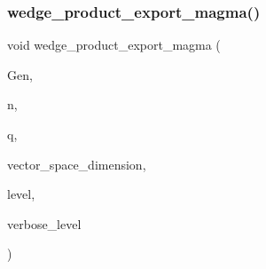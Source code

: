 \subsubsection{\texorpdfstring{wedge\+\_\+product\+\_\+export\+\_\+magma()}{wedge\_product\_export\_magma()}}
{\footnotesize\ttfamily void wedge\+\_\+product\+\_\+export\+\_\+magma (\begin{DoxyParamCaption}\item[{\mbox{\hyperlink{classgenerator}{generator}} $\ast$}]{Gen,  }\item[{\mbox{\hyperlink{galois_8h_a09fddde158a3a20bd2dcadb609de11dc}{I\+NT}}}]{n,  }\item[{\mbox{\hyperlink{galois_8h_a09fddde158a3a20bd2dcadb609de11dc}{I\+NT}}}]{q,  }\item[{\mbox{\hyperlink{galois_8h_a09fddde158a3a20bd2dcadb609de11dc}{I\+NT}}}]{vector\+\_\+space\+\_\+dimension,  }\item[{\mbox{\hyperlink{galois_8h_a09fddde158a3a20bd2dcadb609de11dc}{I\+NT}}}]{level,  }\item[{\mbox{\hyperlink{galois_8h_a09fddde158a3a20bd2dcadb609de11dc}{I\+NT}}}]{verbose\+\_\+level }\end{DoxyParamCaption})}

